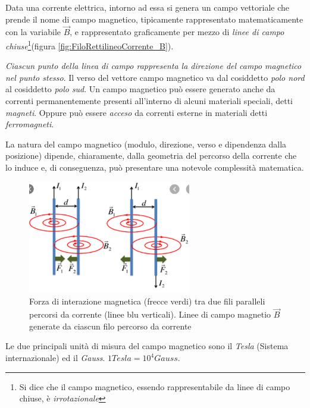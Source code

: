 \documentclass[17pt]{extarticle}
\begin{document}
Data una corrente elettrica, intorno ad essa si genera un campo vettoriale che prende il nome di campo magnetico, tipicamente rappresentato matematicamente con la variabile $\vec{B}$, e rappresentato graficamente per mezzo di \emph{linee di campo chiuse}\footnote{Si dice che il campo magnetico, essendo rappresentabile da linee di campo chiuse, è \emph{irrotazionale} }(figura \ref{fig:FiloRettilineoCorrente_B}). 

\emph{Ciascun punto della linea di campo rappresenta la direzione del campo magnetico nel punto stesso}. Il verso del vettore campo magnetico va dal cosiddetto \emph{polo nord} al cosiddetto \emph{polo sud}.
Un campo magnetico può essere generato anche da correnti permanentemente presenti all'interno di alcuni materiali speciali, detti \emph{magneti}. Oppure può essere \emph{acceso} da correnti esterne in materiali detti \emph{ferromagneti}.

La natura del campo magnetico (modulo, direzione, verso e dipendenza dalla posizione) dipende, chiaramente, dalla geometria del percorso 
della corrente che lo induce e, di conseguenza, può presentare una notevole complessità matematica.





\begin{figure}[b!]		
	\centering
   	\includegraphics[width=2.8in]{campoMagneticoFiliParalleli.png}	
  	\caption{Forza di interazione magnetica (frecce verdi) tra due fili paralleli percorsi da corrente (linee blu verticali). Linee di campo magnetio $\vec{B}$ generate da ciascun filo percorso da corrente}
   	\label{fig:campoMagneticoFiliParalleli}%
\end{figure}






Le due principali unità di misura del campo magnetico sono il \emph{Tesla} (Sistema internazionale) ed il \emph{Gauss}. $1 Tesla = 10^4 Gauss$.
\end{document}
